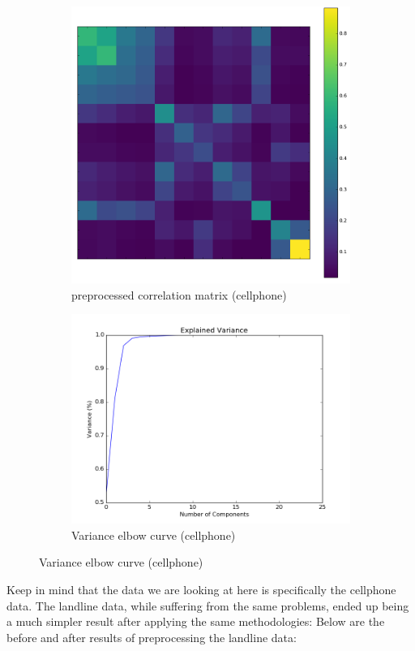 \documentclass[20pt]{article} %
\begin{document}
\begin{figure}[!htbp]
  	\centering
   	\begin{subfigure}[p]{0.4\linewidth}
    	\includegraphics[width=\linewidth]{../figures/redacted/correlation_matrix.png}
	\caption{preprocessed correlation matrix (cellphone)}
   	\end{subfigure}
   	\begin{subfigure}[p]{0.4\linewidth}
    	\includegraphics[width=\linewidth]{../figures/better_cov.png}
	\caption{Variance elbow curve (cellphone)}
   	\end{subfigure}
\end{figure} 
\newpage
Keep in mind that the data we are looking at here is specifically the cellphone data.  The landline data, while suffering from the same problems, ended up being a much simpler result after applying the same methodologies: Below are the before and after results of preprocessing the landline data:
\end{document}
